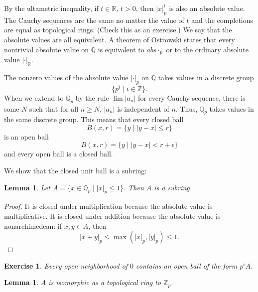 \documentclass{amsart}
\newcommand{\ring}[1]{\mathbb{#1}}
\newtheorem{lemma}[equation]{Lemma}
\newtheorem{exercise}{Exercise}
\def\abs#1{{|#1|}}
\begin{document}
By the ultametric inequality, if $t\in \ring{R}$, $t>0$, then
$\abs{x}_p^t$ is also an absolute value.  The Cauchy sequences are the
same no matter the value of $t$ and the completions are equal as
topological rings.  (Check this as an exercise.)  We say that the
absolute values are all equivalent.  A theorem of Ostrowski
\cite[Theorem 6.15]{knapp-advanced} states that every nontrivial
absolute value on $\ring{Q}$ is equivalent to $abs{\cdot}_p$ or to the
ordinary absolute value $\abs{\cdot}_{\ring{R}}$.

The nonzero values of the
absolute value $\abs{\cdot}_p$ on $\ring{Q}$ takes values in a discrete group
\[
\{p^i \mid i\in \ring{Z}\}.
\]
When we extend to $\ring{Q}_p$ by the rule $\lim \abs{a_n}$ for every Cauchy
sequence, there is some
$N$ such that for all $n\ge N$, $\abs{a_n}$ is independent of $n$.
Thus, $\ring{Q}_p$ takes values in the same discrete group.
This means that every closed ball 
\[
B(x,r) = \{y\mid \abs{y-x}\le r\}
\]
is an open ball
\[
B(x,r) = \{y\mid \abs{y-x}< r+\epsilon\}
\]
and every open ball is a closed ball.

We show that the closed unit ball is a subring:

\begin{lemma}
Let $A = \{x\in \ring{Q}_p \mid \abs{x}_p\le 1\}$.
Then $A$ is a subring.
\end{lemma}

\begin{proof} It is closed under multiplication because the absolute
value is multiplicative.  It is closed under addition because the absolute
value is nonarchimedean:  if $x,y\in A$, then
\[
\abs{x + y}_p \le \max(\abs{x}_p,\abs{y}_p)\le 1.
\]
\end{proof}

\begin{exercise} Every open neighborhood of $0$ contains an open ball of the
form $p^i A$.
\end{exercise}


\begin{lemma}  $A$ is isomorphic as a topological ring to $\ring{Z}_p$.
\end{lemma}
\end{document}
